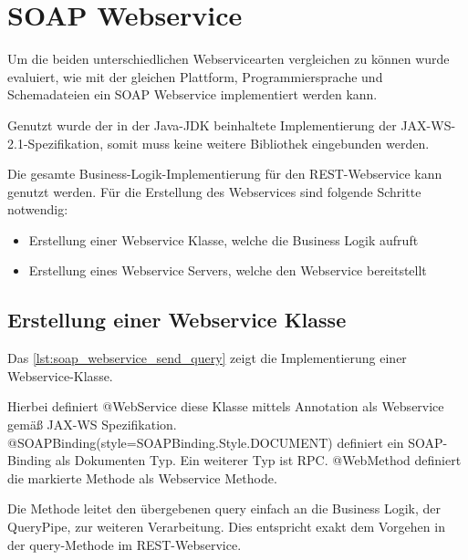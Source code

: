 \chapter{SOAP Webservice} \label{kap:anhang_soap_webservice}

Um die beiden unterschiedlichen Webservicearten vergleichen zu können wurde evaluiert, wie mit der gleichen Plattform, Programmiersprache und Schemadateien ein SOAP \gls{Webservice} implementiert werden kann. 

Genutzt wurde der in der Java-JDK beinhaltete Implementierung der JAX-WS-2.1-Spezifikation, somit muss keine weitere Bibliothek eingebunden werden. 

Die gesamte Business-Logik-Implementierung für den REST-Webservice kann genutzt werden. Für die Erstellung des Webservices sind folgende Schritte notwendig:

\begin{itemize}
\item Erstellung einer Webservice Klasse, welche die Business Logik aufruft
\item Erstellung eines Webservice Servers, welche den Webservice bereitstellt
\end{itemize}

\section{Erstellung einer Webservice Klasse}

Das \autoref{lst:soap_webservice_send_query} zeigt die Implementierung einer Webservice-Klasse. 

Hierbei definiert @WebService diese Klasse mittels Annotation als Webservice gemäß JAX-WS Spezifikation. 
@SOAPBinding(style=SOAPBinding.Style.DOCUMENT) definiert ein SOAP-Binding als Dokumenten Typ. Ein weiterer Typ ist RPC.
@WebMethod definiert die markierte Methode als Webservice Methode. 

Die Methode leitet den übergebenen query einfach an die Business Logik, der QueryPipe, zur weiteren Verarbeitung. Dies entspricht exakt dem Vorgehen in der query-Methode im REST-Webservice.  

